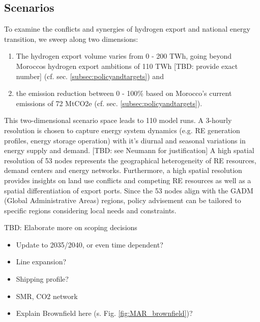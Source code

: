 

\subsection{Scenarios}
\label{subsec:scenarios}
To examine the conflicts and synergies of hydrogen export and national energy transition, we sweep along two dimensions:
\begin{enumerate}
    \item The hydrogen export volume varies from 0 - 200 TWh, going beyond Moroccos hydrogen export ambitions of 110 TWh [TBD: provide exact number] (cf. sec. \ref{subsec:policyandtargets}) and
    \item the emission reduction between 0 - 100\% based on Morocco's current emissions of 72 MtCO2e (cf. sec. \ref{subsec:policyandtargets}).
\end{enumerate}
This two-dimensional scenario space leads to 110 model runs. 
A 3-hourly resolution is chosen to capture energy system dynamics (e.g. RE generation profiles, energy storage operation) with it's diurnal and seasonal variations in energy supply and demand. [TBD: see Neumann for justification]
A high spatial resolution of 53 nodes represents the geographical heterogeneity of RE resources, demand centers and energy networks. Furthermore, a high spatial resolution provides insights on land use conflicts and competing RE resources as well as a spatial differentiation of export ports. Since the 53 nodes align with the GADM (Global Administrative Areas) regions, policy advisement can be tailored to specific regions considering local needs and constraints.

TBD: Elaborate more on scoping decisions
\begin{itemize}
    \item Update to 2035/2040, or even time dependent?
    \item Line expansion?
    \item Shipping profile?
    \item SMR, CO2 network
    \item Explain Brownfield here (s. Fig. \ref{fig:MAR_brownfield})?
\end{itemize}



